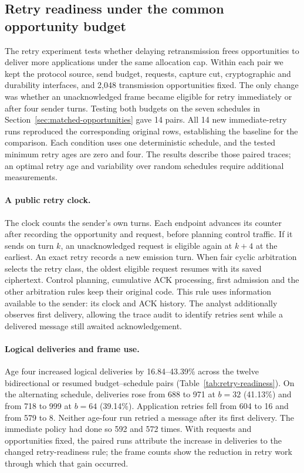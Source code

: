 \subsection{Retry readiness under the common opportunity budget}
\label{sec:retry-readiness}

The retry experiment tests whether delaying retransmission frees
opportunities to deliver more applications under the same allocation cap.
Within each pair we kept the protocol source, send budget, requests,
capture cut, cryptographic and durability interfaces, and 2,048
transmission opportunities fixed. The only change was whether an
unacknowledged frame became eligible for retry immediately or after
four sender turns. Testing both budgets on the seven schedules in
Section~\ref{sec:matched-opportunities} gave 14 pairs. All 14 new
immediate-retry runs reproduced the corresponding original rows,
establishing the baseline for the comparison.
Each condition uses one deterministic schedule, and the tested minimum
retry ages are zero and four. The results describe those paired traces;
an optimal retry age and variability over random schedules require
additional measurements.

\paragraph{A public retry clock.}
The clock counts the sender's own turns. Each endpoint advances its
counter after recording the opportunity and request, before planning
control traffic. If it sends on turn $k$, an unacknowledged request is
eligible again at $k+4$ at the earliest. An exact retry records a new
emission turn. When fair cyclic arbitration selects the retry class,
the oldest eligible request resumes with its saved ciphertext. Control
planning, cumulative ACK processing, first admission and the other
arbitration rules keep their original code.
This rule uses information available to the sender: its clock and ACK
history. The analyst additionally observes first delivery, allowing the
trace audit to identify retries sent while a delivered message still
awaited acknowledgement.



\paragraph{Logical deliveries and frame use.}
Age four increased logical deliveries by 16.84--43.39\% across the
twelve bidirectional or resumed budget--schedule pairs
(Table~\ref{tab:retry-readiness}). On the alternating schedule,
deliveries rose from 688 to 971 at $b=32$ (41.13\%) and from 718 to
999 at $b=64$ (39.14\%). Application retries fell from 604 to 16 and
from 579 to 8. Neither age-four run retried a message after its first
delivery. The immediate policy had done so 592 and 572 times. With
requests and opportunities fixed, the paired runs attribute the increase
in deliveries to the changed retry-readiness rule; the frame counts show the
reduction in retry work through which that gain occurred.


